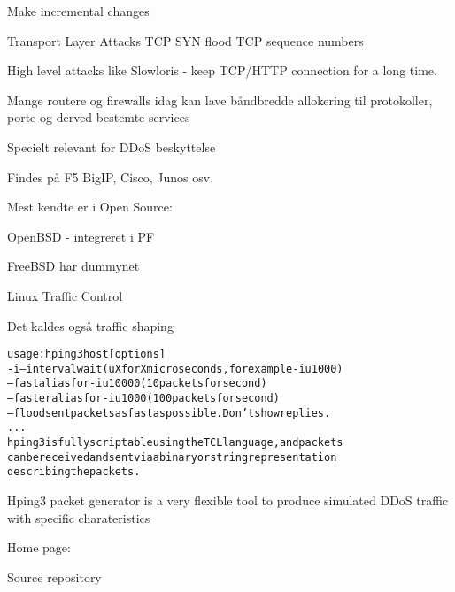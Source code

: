 \documentclass[Screen16to9,17pt]{foils}
\begin{document}
Make incremental changes



\begin{list2}
\item Transport Layer Attacks TCP SYN flood TCP sequence numbers
\item High level attacks like Slowloris - keep TCP/HTTP connection for a long time.
\end{list2}


\begin{list1}
\item Mange routere og firewalls idag kan lave båndbredde allokering til
  protokoller, porte og derved bestemte services
  \item Specielt relevant for DDoS beskyttelse
  \item Findes på F5 BigIP, Cisco, Junos osv.
\item Mest kendte er i Open Source:
\begin{list2}
\item OpenBSD - integreret i PF
\item FreeBSD har dummynet
\item Linux Traffic Control
\end{list2}
\item Det kaldes også traffic shaping
\end{list1}


\begin{alltt}\footnotesize
usage: hping3 host [options]
  -i  --interval  wait (uX for X microseconds, for example -i u1000)
      --fast      alias for -i u10000 (10 packets for second)
      --faster    alias for -i u1000 (100 packets for second)
      --flood      sent packets as fast as possible. Don't show replies.
...
hping3 is fully scriptable using the TCL language, and packets
can be received and sent via a binary or string representation
describing the packets.
\end{alltt}

\begin{list2}
\item Hping3 packet generator is a very flexible tool to produce simulated DDoS traffic with specific charateristics
\item Home page: 
\item Source repository 
\end{list2}
\end{document}
